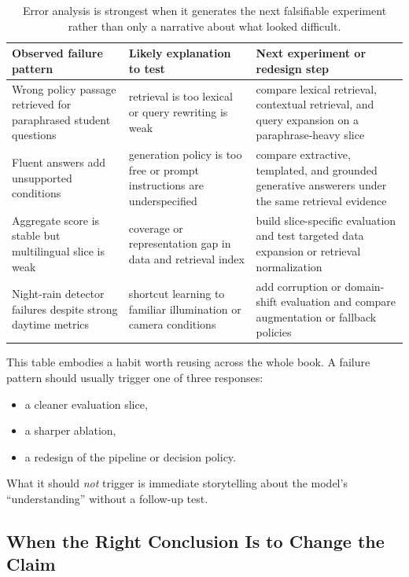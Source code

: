 \begin{table}[t]
\centering
\small
\setlength{\tabcolsep}{4pt}
\begin{tabular}{p{3.02cm}p{3.18cm}p{3.74cm}}
\toprule
Observed failure pattern & Likely explanation to test & Next experiment or redesign step \\
\midrule
Wrong policy passage retrieved for paraphrased student questions & retrieval is too lexical or query rewriting is weak & compare lexical retrieval, contextual retrieval, and query expansion on a paraphrase-heavy slice \\
Fluent answers add unsupported conditions & generation policy is too free or prompt instructions are underspecified & compare extractive, templated, and grounded generative answerers under the same retrieval evidence \\
Aggregate score is stable but multilingual slice is weak & coverage or representation gap in data and retrieval index & build slice-specific evaluation and test targeted data expansion or retrieval normalization \\
Night-rain detector failures despite strong daytime metrics & shortcut learning to familiar illumination or camera conditions & add corruption or domain-shift evaluation and compare augmentation or fallback policies \\
\bottomrule
\end{tabular}
\caption{Error analysis is strongest when it generates the next falsifiable experiment rather than only a narrative about what looked difficult.}
\label{tab:error-cluster-next-experiment}
\end{table}

This table embodies a habit worth reusing across the whole book. A failure pattern should usually trigger one of three responses:
\begin{itemize}[leftmargin=*]
\item a cleaner evaluation slice,
\item a sharper ablation,
\item a redesign of the pipeline or decision policy.
\end{itemize}
What it should \emph{not} trigger is immediate storytelling about the model's ``understanding'' without a follow-up test.

\subsection{When the Right Conclusion Is to Change the Claim}


